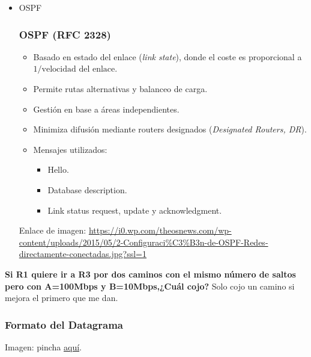 \documentclass[a4paper,12pt]{article}
\begin{document}
\begin{itemize}
    \item OSPF 
    \subsubsection*{OSPF (RFC 2328)}

    \begin{itemize}
        \item Basado en estado del enlace (\textit{link state}), donde el coste es proporcional a \(1 / \text{velocidad del enlace}\).
        \item Permite rutas alternativas y balanceo de carga.
        \item Gestión en base a áreas independientes.
        \item Minimiza difusión mediante routers designados (\textit{Designated Routers, DR}).
        \item Mensajes utilizados:
        \begin{itemize}
            \item Hello.
            \item Database description.
            \item Link status request, update y acknowledgment.
        \end{itemize}
    \end{itemize}

    Enlace de imagen: \url{https://i0.wp.com/theosnews.com/wp-content/uploads/2015/05/2-Configuraci%C3%B3n-de-OSPF-Redes-directamente-conectadas.jpg?ssl=1}

\end{itemize}



\begin{tcolorbox}[colback=blue!5!white,colframe=blue!75!black,title=Pregunta de Examen]
    \textbf{Si R1 quiere ir a R3 por dos caminos con el mismo número de saltos pero con A=100Mbps y B=10Mbps,¿Cuál cojo?}
    Solo cojo un camino si mejora el primero que me dan.
\end{tcolorbox}

\subsubsection{Formato del Datagrama}

Imagen: pincha \href{https://blogger.googleusercontent.com/img/b/R29vZ2xl/AVvXsEiEEYTrMsBMcUuMgs5GyGPSG0T5O2QECfeWvZaik5PAOFnwYuSL3oMsYZKoTSd4F8kEhdOBzseuzHFQyWU4F22N2D7eWP_JwpUukMVGNcF5EbRSWdFb2B0qndVeLgDerXWbrSH79YsKmlA/w1200-h630-p-k-no-nu/Datagrama+IP.+IP+Datagram.jpg}{aquí}.
\end{document}
